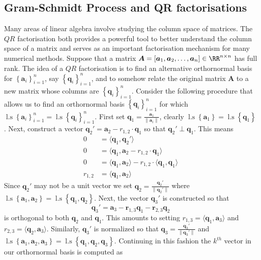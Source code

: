 \subsection{Gram-Schmidt Process and QR factorisations}\label{Section4.2}

Many areas of linear algebra involve studying the column space of matrices. The $QR$ factorisation both provides a powerful tool to better understand the column space of a matrix and serves as an important factorisation mechanism for many numerical methods. Suppose that a matrix $\bm{A} = \left[ \bm{a}_1 , \bm{a}_2 , \ldots , \bm{a}_n \right] \in \RR^{n \times n}$ has full rank. The idea of a $QR$ factorisation is to find an alternative orthornormal basis for $\left\{ \bm{a}_i \right\}_{i=1}^{n}$, say $\left\{ \bm{q}_i \right\}_{i=1}^{n}$, and to somehow relate the original matrix $\bm{A}$ to a new matrix whose columns are $\left\{ \bm{q}_i \right\}_{i=1}^{n}$. Consider the following procedure that allows us to find an orthornormal basis $\left\{ \bm{q}_i \right\}_{i=1}^{n}$ for which $\operatorname{l.s} \left\{ \bm{a}_i \right\}_{i=1}^{n} = \operatorname{l.s} \left\{ \bm{q}_i \right\}_{i=1}^{n} $. First set $\bm{q}_1 = \frac{\bm{a}_1}{\| \bm{a}_i \|}$, clearly $\operatorname{l.s} \left\{ \bm{a}_1 \right\} = \operatorname{l.s} \left\{ \bm{q}_1 \right\}$. Next, construct a vector $\bm{q}_2' = \bm{a}_2 - r_{1,2} \cdot \bm{q}_1$ so that $\bm{q}_2' \perp \bm{q}_1$. This means
\begin{align*}
    0       & = \langle \bm{q}_1, \bm{q}_2' \rangle                                                   \\
    0       & = \langle \bm{q}_1, \bm{a}_2 - r_{1,2} \cdot \bm{q}_1 \rangle                           \\
    0       & = \langle \bm{q}_1, \bm{a}_2 \rangle - r_{1,2} \cdot \langle \bm{q}_1, \bm{q}_1 \rangle \\
    r_{1,2} & = \langle \bm{q}_1, \bm{a}_2 \rangle
\end{align*}
Since $\bm{q}_2'$ may not be a unit vector we set $\bm{q}_2 = \frac{\bm{q}_2'}{\| \bm{q}_2' \|}$ where $\operatorname{l.s} \left\{ \bm{a}_1, \bm{a}_2 \right\} = \operatorname{l.s} \left\{ \bm{q}_1, \bm{q}_2 \right\}$. Next, the vector $\bm{q}_3'$ is constructed so that
\[
    \bm{q}_3' = \bm{a}_3 - \bm{r}_{1,3} \bm{q}_1 - \bm{r}_{2,3} \bm{q}_2
\]
is orthogonal to both $\bm{q}_2$ and $\bm{q}_1$. This amounts to setting $r_{1,3} = \langle \bm{q}_1, \bm{a}_3 \rangle$ and $r_{2,3} = \langle \bm{q}_2, \bm{a}_{3} \rangle$. Similarly, $\bm{q}_3'$ is normalized so that $\bm{q}_3 = \frac{\bm{q}_3'}{\| \bm{q}_3' \|}$ and $\operatorname{l.s} \left\{ \bm{a}_1, \bm{a}_2, \bm{a}_3 \right\} = \operatorname{l.s} \left\{ \bm{q}_1, \bm{q}_2, \bm{q}_3 \right\}$. Continuing in this fashion the $k^{th}$ vector in our orthornormal basis is computed as
